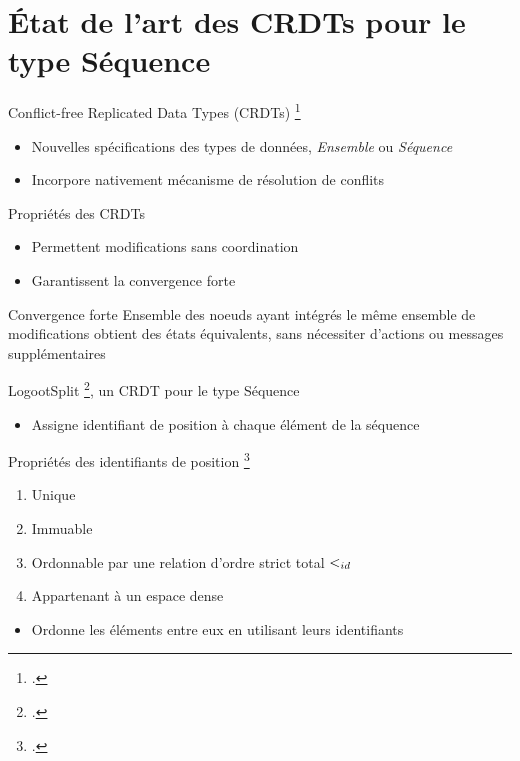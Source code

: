 \section{État de l'art des CRDTs pour le type Séquence}

\begin{frame}{Conflict-free Replicated Data Types (CRDTs) \footcite{shapiro_2011_crdt}}
    \begin{itemize}
        \item Nouvelles spécifications des types de données, \eg \emph{Ensemble} ou \emph{Séquence}
        \item Incorpore nativement mécanisme de résolution de conflits
    \end{itemize}
    \pause
    \begin{block}{Propriétés des CRDTs}
        \begin{itemize}
            \item Permettent modifications \alert{sans coordination}
            \item Garantissent la \alert{convergence forte}
        \end{itemize}
    \end{block}
    \pause
    \begin{block}{Convergence forte}
        Ensemble des noeuds ayant intégrés le même ensemble de modifications obtient des états équivalents, sans nécessiter d'actions ou messages supplémentaires
    \end{block}
\end{frame}

\begin{frame}{LogootSplit \footcite{2013-logootsplit}, un CRDT pour le type Séquence}
    \begin{itemize}
        \item Assigne \alert{identifiant de position} à chaque élément de la séquence
    \end{itemize}
    \pause
    \begin{block}{Propriétés des identifiants de position \footcite{2009-treedoc-preguica}}
        \begin{enumerate}
            \item Unique
            \item Immuable
            \item Ordonnable par une relation d'ordre strict total $<_{id}$
            \item Appartenant à un espace dense
        \end{enumerate}
    \end{block}
    \pause
    \begin{itemize}
        \item \alert{Ordonne les éléments} entre eux \alert{en utilisant} leurs \alert{identifiants}
    \end{itemize}
\end{frame}

